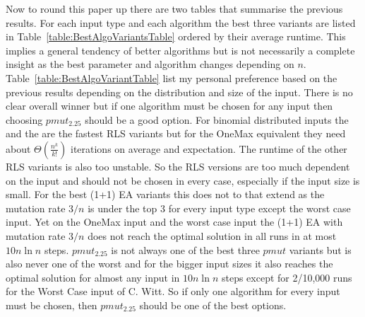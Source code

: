 Now to round this paper up there are two tables that summarise the previous results.
For each input type and each algorithm the best three variants are listed in Table~\ref{table:BestAlgoVariantsTable} ordered by their average runtime.
This implies a general tendency of better algorithms but is not necessarily a complete insight as the best parameter and algorithm changes depending on $n$.
Table~\ref{table:BestAlgoVariantTable} list my personal preference based on the previous results depending on the distribution and size of the input.
There is no clear overall winner but if one algorithm must be chosen for any input then choosing $pmut_{2.25}$ should be a good option.
For binomial distributed inputs the \RLSN[2] and the \RLSN[4] are the fastest RLS variants but for the OneMax equivalent they need about \(\Theta(\frac{n^k}{k!})\) iterations on average and expectation.
The runtime of the other RLS variants is also too unstable.
So the RLS versions are too much dependent on the input and should not be chosen in every case, especially if the input size is small.
For the best (1+1) EA variants this does not to that extend as the mutation rate $3/n$ is under the top 3 for every input type except the worst case input.
Yet on the OneMax input and the worst case input the (1+1) EA with mutation rate $3/n$ does not reach the optimal solution in all runs in at most $10n\ln{n}$ steps.
$pmut_{2.25}$ is not always one of the best three $pmut$ variants but is also never one of the worst and for the bigger input sizes it also reaches the optimal solution for almost any input in $10n\ln{n}$ steps except for 2/10,000 runs for the Worst Case input of C. Witt.
So if only one algorithm for every input must be chosen, then $pmut_{2.25}$ should be one of the best options.

